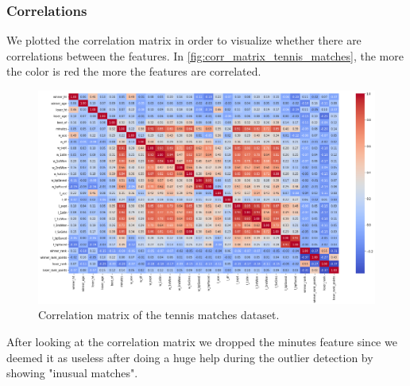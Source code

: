 \subsubsection{Correlations}
We plotted the correlation matrix in order to visualize whether there are correlations between the features. In \autoref{fig:corr_matrix_tennis_matches}, the more the color is red the more the features are correlated.
\begin{figure}[H]
    \centering
    \includegraphics[width= 0.8\linewidth]{images/data_understanding/correlation.png}
    \caption{Correlation matrix of the tennis matches dataset.}
    \label{fig:corr_matrix_tennis_matches}
\end{figure}
After looking at the correlation matrix we dropped the minutes feature since we deemed it as useless after doing a huge help during the outlier detection by showing "inusual matches". 